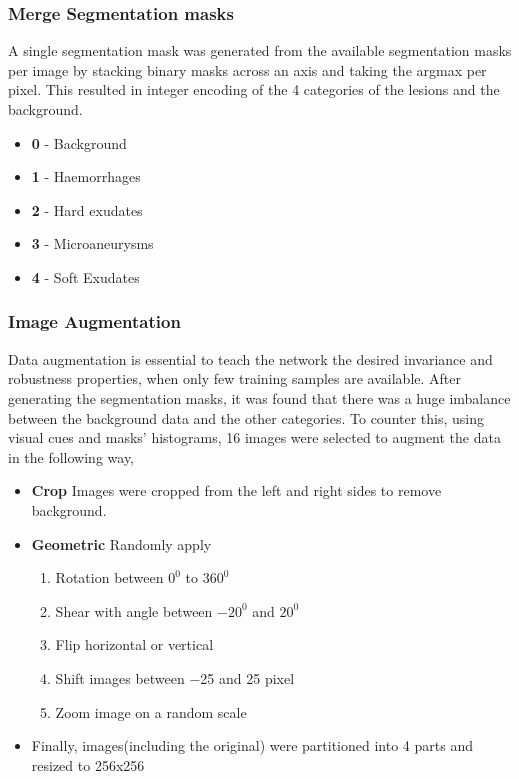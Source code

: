 \documentclass[conference]{IEEEtran}
\begin{document}
\subsubsection{Merge Segmentation masks}
\label{sssec:merge}

A single segmentation mask was generated from the available segmentation masks per image by stacking binary masks across an axis and taking the argmax per pixel. This resulted in integer encoding of the 4 categories of the lesions and the background.
\begin{itemize}
		\item \textbf{0}  - Background
		\item \textbf{1}  - Haemorrhages
		\item \textbf{2}  - Hard exudates
		\item \textbf{3}  - Microaneurysms 
  		\item \textbf{4}  - Soft Exudates
\end{itemize} 



\subsubsection{Image Augmentation}
\label{sssec:aug}
Data augmentation is essential to teach the network the desired invariance and robustness properties, when only few training samples are available. After generating the segmentation masks, it was found that there was a huge imbalance between the background data and the other categories. To counter this, using visual cues and masks’ histograms, 16 images were selected to augment the data in the following way, 

\begin{itemize}
		\item \textbf{Crop} Images were cropped from the left and right sides to remove background.
		\item \textbf{Geometric} Randomly apply 
					\begin{enumerate}
  						\item Rotation between $0^{0}$ to $360^{0}$
	  					 \item Shear with angle between $-20^{0}$ and $20^{0}$
  					 	\item Flip horizontal or vertical
  					 	\item Shift images between −25 and 25 pixel
  					 	\item Zoom image on a random scale
					\end{enumerate}
		\item Finally, images(including the original) were partitioned into 4 parts and resized to 256x256
\end{itemize} 
\end{document}
